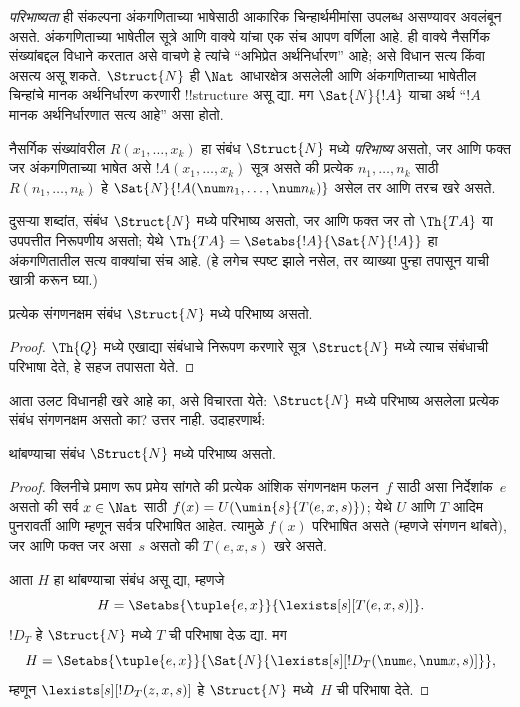 \documentclass[../../../include/open-logic-section]{subfiles}
\begin{document}


\emph{परिभाष्यता} ही संकल्पना
अंकगणिताच्या भाषेसाठी
आकारिक चिन्हार्थमीमांसा
उपलब्ध असण्यावर
अवलंबून असते.
अंकगणिताच्या भाषेतील
सूत्रे आणि वाक्ये
यांचा एक संच आपण
वर्णिला आहे.
ही वाक्ये नैसर्गिक
संख्यांबद्दल विधाने
करतात असे वाचणे
हे त्यांचे “अभिप्रेत
अर्थनिर्धारण” आहे;
असे विधान सत्य
किंवा असत्य असू
शकते.
$\Struct{N}$ ही
$\Nat$ आधारक्षेत्र
असलेली आणि
अंकगणिताच्या भाषेतील
चिन्हांचे मानक
अर्थनिर्धारण करणारी
!!{structure} असू द्या.
मग $\Sat{N}{!A}$
याचा अर्थ “$!A$
मानक अर्थनिर्धारणात
सत्य आहे” असा होतो.

\begin{defn}
नैसर्गिक संख्यांवरील
$R(x_1,\dots,x_k)$ हा
संबंध $\Struct{N}$
मध्ये \emph{परिभाष्य}
असतो, जर आणि फक्त जर
अंकगणिताच्या भाषेत
असे $!A(x_1,\dots,x_k)$
सूत्र असते की
प्रत्येक $n_1,\dots,n_k$
साठी $R(n_1,\dots,n_k)$
हे $\Sat{N}{!A(\num n_1,\dots,\num
  n_k)}$ असेल
तर आणि तरच खरे असते.
\end{defn}

दुसऱ्या शब्दांत,
संबंध $\Struct{N}$
मध्ये परिभाष्य
असतो, जर आणि फक्त
जर तो $\Th{TA}$
या उपपत्तीत निरूपणीय
असतो; येथे
$\Th{TA} =
\Setabs{!A}{\Sat{N}{!A}}$
हा अंकगणितातील
सत्य वाक्यांचा
संच आहे.
(हे लगेच स्पष्ट
झाले नसेल, तर
व्याख्या पुन्हा
तपासून याची
खात्री करून घ्या.)

\begin{lem}
प्रत्येक संगणनक्षम
संबंध $\Struct{N}$
मध्ये परिभाष्य
असतो.
\end{lem}

\begin{proof}
$\Th{Q}$ मध्ये
एखाद्या संबंधाचे
निरूपण करणारे
सूत्र $\Struct{N}$
मध्ये त्याच संबंधाची
परिभाषा देते, हे
सहज तपासता येते.
\end{proof}

आता उलट विधानही
खरे आहे का, असे
विचारता येते:
$\Struct{N}$ मध्ये
परिभाष्य असलेला
प्रत्येक संबंध
संगणनक्षम असतो
का? उत्तर नाही.
उदाहरणार्थ:

\begin{lem}
थांबण्याचा संबंध
$\Struct{N}$ मध्ये
परिभाष्य असतो.
\end{lem}

\begin{proof}
क्लिनीचे प्रमाण
रूप प्रमेय सांगते
की प्रत्येक आंशिक
संगणनक्षम फलन~$f$
साठी असा निर्देशांक~$e$
असतो की सर्व
$x \in \Nat$ साठी
$f(x) =
U(\umin{s}{T(e,x,s)})$;
येथे $U$ आणि $T$
आदिम पुनरावर्ती
आणि म्हणून सर्वत्र
परिभाषित आहेत.
त्यामुळे $f(x)$
परिभाषित असते
(म्हणजे संगणन
थांबते), जर आणि
फक्त जर असा~$s$
असतो की $T(e,x,s)$
खरे असते.

आता $H$ हा
थांबण्याचा संबंध
असू द्या, म्हणजे
\[
H = \Setabs{\tuple{e,x}}{\lexists[s][T(e, x, s)]}.
\]
$!D_T$ हे
$\Struct{N}$ मध्ये
$T$ ची परिभाषा
देऊ द्या. मग
\[
H = \Setabs{\tuple{e,x}}{\Sat{N}{\lexists[s][!D_T(\num e, \num x, s)]}},
\]
म्हणून $\lexists[s][!D_T(z, x, s)]$
हे $\Struct{N}$
मध्ये~$H$ ची
परिभाषा देते.
\end{proof}
\end{document}
